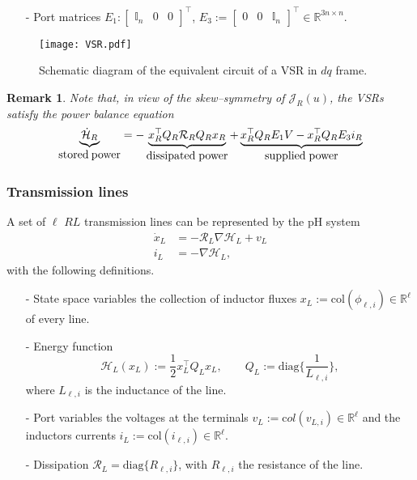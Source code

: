 \documentclass[5p,twocolumn]{elsarticle}
\def\begequ{\begin{equation}}
\def\endequ{\end{equation}}
\def\lab{\label}
\def\begrem{\begin{remark}\rm}
\def\endrem{\end{remark}}
\newtheorem{remark}[theorem]{Remark}
\numberwithin{equation}{section}
\begin{document}
\begin{itemize}
\item[-] Port matrices $E_1:\begin{bmatrix}
\mathbb{I}_n&0&0
\end{bmatrix}^\top$, $E_3:=\begin{bmatrix}
0&0&\mathbb{I}_n
\end{bmatrix}^\top\in\mathbb{R}^{3n\times n}$.
\end{itemize}
\begin{figure}[ht]
 \centering
\texttt{[image: VSR.pdf]}
 \caption{Schematic diagram of the equivalent circuit of a VSR in $dq$ frame.}
 \label{rectifier}
\end{figure}

\begrem
Note that, in view of the skew--symmetry of $\mathcal{J}_{R}(u)$, the VSRs satisfy the power balance equation
\begequ
\lab{powbal}
\underbrace{\dot {\mathcal H}_R}_{\mbox{stored\:power}}=-\underbrace{x_R^\top Q_R\mathcal{R}_RQ_Rx_R}_{\mbox{dissipated\;power}}+\underbrace{x_R^\top Q_RE_1V-x_R^\top Q_RE_3i_R}_{\mbox{supplied\;power}}
\endequ
\endrem
\subsubsection{Transmission lines}
A set of $\ell$ $RL$ transmission lines can be represented by the pH system
\begin{equation}
\begin{aligned}
\dot x_{L} &=-\mathcal{R}_{L}\nabla\mathcal H_{L}+v_{L}\\
i_{L}&=-\nabla\mathcal H_{L},
\end{aligned}
\label{PHline}
\end{equation}
with  the following definitions.
\begin{itemize}
\item[-] State space variables the collection of inductor fluxes $x_{L}:=\mathrm{col}(\phi_{\ell,i})\in\mathbb{R}^\ell$ of every line.
\item[-] Energy function
\begin{equation*}
\mathcal H_{L}(x_{L}):=\frac{1}{2} x_L^\top Q_{L} x_{L},\qquad Q_{L}:=\mathrm{diag}\{\frac{1}{L_{\ell,i}}\},
\end{equation*}
where $L_{\ell,i}$ is the inductance of the line.

\item[-] Port variables the voltages at the terminals $v_{L}:=\mathrm col(v_{L,i})\in\mathbb{R}^\ell$ and the inductors currents $i_{L}:=\mathrm{col}(i_{\ell,i})\in\mathbb{R}^\ell$.

\item[-] Dissipation $\mathcal{R}_{L}=\mathrm{diag}\{R_{\ell,i}\}$, with $R_{\ell,i}$ the resistance of the line.
\end{itemize}
\end{document}
